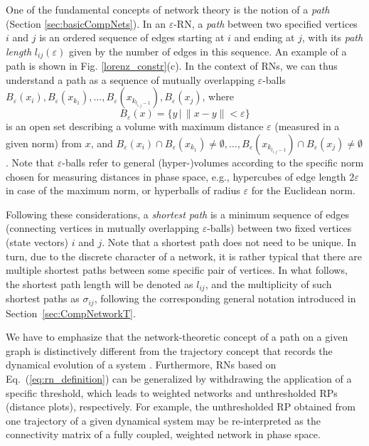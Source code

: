 		One of the fundamental concepts of network theory is the notion of a {\textit{path}} (Section \ref{sec:basicCompNets}). In an $\varepsilon$-RN, a \emph{path} between two specified vertices $i$ and $j$ is an ordered sequence of edges starting at $i$ and ending at $j$, with its \emph{path length} $l_{ij}(\varepsilon)$ given by the number of edges in this sequence. An example of a path is shown in Fig. \ref{lorenz_constr}(c). In the context of RNs, we can thus understand a path as a sequence of mutually overlapping $\varepsilon$-balls $B_{\varepsilon}(x_i),B_{\varepsilon}(x_{k_1}),\dots,B_{\varepsilon}(x_{k_{l_{i,j}-1}}),B_{\varepsilon}(x_j)$, where $$B_{\varepsilon}(x)=\{y\,|\,\|x-y\|<\varepsilon\}$$ is an open set describing a volume with maximum distance $\varepsilon$ (measured in a given norm) from $x$, and $B_{\varepsilon}(x_i)\cap B_{\varepsilon}(x_{k_1})\neq\emptyset,\dots,B_{\varepsilon}(x_{k_{l_{i,j}-1}})\cap B_{\varepsilon}(x_j)\neq\emptyset$. Note that $\varepsilon$-balls refer to general (hyper-)volumes according to the specific norm chosen for measuring distances in phase space, e.g., hypercubes of edge length $2 \varepsilon$ in case of the maximum norm, or hyperballs of radius $\varepsilon$ for the Euclidean norm.

		Following these considerations, a \emph{shortest path} is a minimum sequence of edges (connecting vertices in mutually overlapping $\varepsilon$-balls) between two fixed vertices (state vectors) $i$ and $j$. Note that a shortest path does not need to be unique. In turn, due to the discrete character of a network, it is rather typical that there are multiple shortest paths between some specific pair of vertices. In what follows, the shortest path length will be denoted as ${l}_{ij}$, and the multiplicity of such shortest paths as ${\sigma}_{ij}$, following the corresponding general notation introduced in Section~\ref{sec:CompNetworkT}.

		We have to emphasize that the network-theoretic concept of a path on a given graph is distinctively different from the trajectory concept that records the dynamical evolution of a system \cite{Donner2010a}. Furthermore, RNs based on Eq.~(\ref{eq:rn_definition}) can be generalized by withdrawing the application of a specific threshold, which leads to weighted networks and unthresholded RPs (distance plots), respectively. For example, the unthresholded RP obtained from one trajectory of a given dynamical system may be re-interpreted as the connectivity matrix of a fully coupled, weighted network in phase space.


